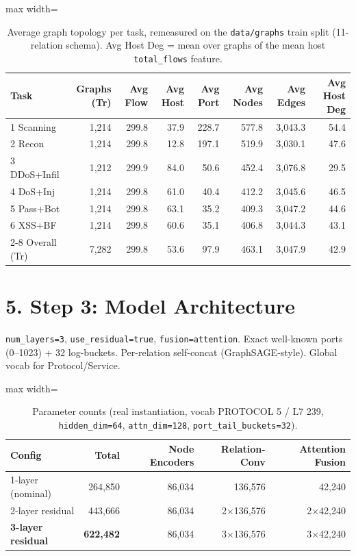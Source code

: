 \documentclass[11pt,a4paper]{article}
\begin{document}
\begin{table}[H]
\centering
\caption{Average graph topology per task, remeasured on the \texttt{data/graphs} train split (11-relation schema). Avg Host Deg = mean over graphs of the mean host \texttt{total\_flows} feature.}
\label{tab:topology}
\begin{adjustbox}{max width=\textwidth}
\begin{tabular}{lrrrrrrr}
\toprule
Task & Graphs (Tr) & Avg Flow & Avg Host & Avg Port & Avg Nodes & Avg Edges & Avg Host Deg \\
\midrule
1 Scanning & 1,214 & 299.8 & 37.9 & 228.7 & 577.8 & 3,043.3 & 54.4 \\
2 Recon & 1,214 & 299.8 & 12.8 & 197.1 & 519.9 & 3,030.1 & 47.6 \\
3 DDoS+Infil & 1,212 & 299.9 & 84.0 & 50.6 & 452.4 & 3,076.8 & 29.5 \\
4 DoS+Inj & 1,214 & 299.8 & 61.0 & 40.4 & 412.2 & 3,045.6 & 46.5 \\
5 Pass+Bot & 1,214 & 299.8 & 63.1 & 35.2 & 409.3 & 3,047.2 & 44.6 \\
6 XSS+BF & 1,214 & 299.8 & 60.6 & 35.1 & 406.8 & 3,044.3 & 43.1 \\
\cmidrule{2-8}
Overall (Tr) & 7,282 & 299.8 & 53.6 & 97.9 & 463.1 & 3,047.9 & 42.9 \\
\bottomrule
\end{tabular}
\end{adjustbox}
\end{table}

\section*{5. Step 3: Model Architecture}
\texttt{num\_layers=3}, \texttt{use\_residual=true}, \texttt{fusion=attention}. Exact well-known ports (0--1023) + 32 log-buckets. Per-relation self-concat (GraphSAGE-style). Global vocab for Protocol/Service.

\begin{table}[H]
\centering
\caption{Parameter counts (real instantiation, vocab PROTOCOL 5 / L7 239, \texttt{hidden\_dim=64}, \texttt{attn\_dim=128}, \texttt{port\_tail\_buckets=32}).}
\label{tab:params}
\begin{adjustbox}{max width=\textwidth}
\begin{tabular}{lrrrr}
\toprule
Config & Total & Node Encoders & Relation-Conv & Attention Fusion \\
\midrule
1-layer (nominal) & 264,850 & 86,034 & 136,576 & 42,240 \\
2-layer residual & 443,666 & 86,034 & 2$\times$136,576 & 2$\times$42,240 \\
\textbf{3-layer residual} & \textbf{622,482} & 86,034 & 3$\times$136,576 & 3$\times$42,240 \\
\bottomrule
\end{tabular}
\end{adjustbox}
\end{table}
\end{document}
